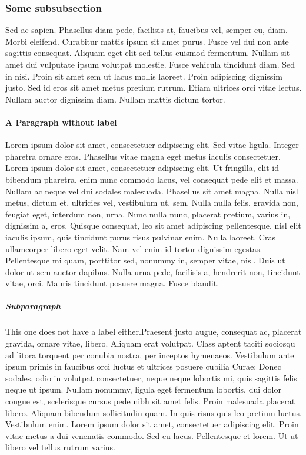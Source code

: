 \documentclass[nochapterpage,nopartpage,numbersubsubsec,bigchapter,colorback,accentcolor=tud9c]{tudreport}
\begin{document}
  \subsubsection{Some subsubsection}
  \label{sec:tech:intro:dirs:subsection:subsubsection}

    Sed ac sapien. Phasellus diam pede, facilisis at, faucibus vel, semper eu, diam. Morbi eleifend. Curabitur mattis ipsum sit amet purus. Fusce vel dui non ante sagittis consequat. Aliquam eget elit sed tellus euismod fermentum. Nullam sit amet dui vulputate ipsum volutpat molestie. Fusce vehicula tincidunt diam. Sed in nisi. Proin sit amet sem ut lacus mollis laoreet. Proin adipiscing dignissim justo. Sed id eros sit amet metus pretium rutrum. Etiam ultrices orci vitae lectus. Nullam auctor dignissim diam. Nullam mattis dictum tortor.

  \paragraph{A Paragraph without label}

    Lorem ipsum dolor sit amet, consectetuer adipiscing elit. Sed vitae ligula. Integer pharetra ornare eros. Phasellus vitae magna eget metus iaculis consectetuer. Lorem ipsum dolor sit amet, consectetuer adipiscing elit. Ut fringilla, elit id bibendum pharetra, enim nunc commodo lacus, vel consequat pede elit et massa. Nullam ac neque vel dui sodales malesuada. Phasellus sit amet magna. Nulla nisl metus, dictum et, ultricies vel, vestibulum ut, sem. Nulla nulla felis, gravida non, feugiat eget, interdum non, urna. Nunc nulla nunc, placerat pretium, varius in, dignissim a, eros. Quisque consequat, leo sit amet adipiscing pellentesque, nisl elit iaculis ipsum, quis tincidunt purus risus pulvinar enim. Nulla laoreet. Cras ullamcorper libero eget velit. Nam vel enim id tortor dignissim egestas. Pellentesque mi quam, porttitor sed, nonummy in, semper vitae, nisl. Duis ut dolor ut sem auctor dapibus. Nulla urna pede, facilisis a, hendrerit non, tincidunt vitae, orci. Mauris tincidunt posuere magna. Fusce blandit.

  \subparagraph{Subparagraph}

    This one does not have a label either.Praesent justo augue, consequat ac, placerat gravida, ornare vitae, libero. Aliquam erat volutpat. Class aptent taciti sociosqu ad litora torquent per conubia nostra, per inceptos hymenaeos. Vestibulum ante ipsum primis in faucibus orci luctus et ultrices posuere cubilia Curae; Donec sodales, odio in volutpat consectetuer, neque neque lobortis mi, quis sagittis felis neque ut ipsum. Nullam nonummy, ligula eget fermentum lobortis, dui dolor congue est, scelerisque cursus pede nibh sit amet felis. Proin malesuada placerat libero. Aliquam bibendum sollicitudin quam. In quis risus quis leo pretium luctus. Vestibulum enim. Lorem ipsum dolor sit amet, consectetuer adipiscing elit. Proin vitae metus a dui venenatis commodo. Sed eu lacus. Pellentesque et lorem. Ut ut libero vel tellus rutrum varius.
\end{document}
